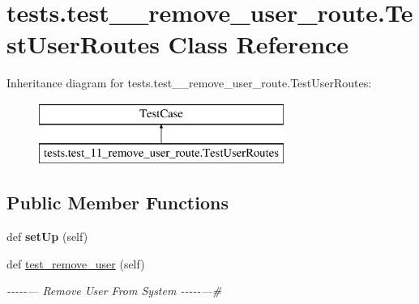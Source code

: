\hypertarget{classtests_1_1test__11__remove__user__route_1_1_test_user_routes}{}\section{tests.\+test\+\_\+\_\+remove\+\_\+user\+\_\+route.\+Test\+User\+Routes Class Reference}
\label{classtests_1_1test__11__remove__user__route_1_1_test_user_routes}
Inheritance diagram for tests.\+test\+\_\+\_\+remove\+\_\+user\+\_\+route.\+Test\+User\+Routes\+:\begin{figure}[H]
\begin{center}
\leavevmode
\includegraphics[height=2.000000cm]{classtests_1_1test__11__remove__user__route_1_1_test_user_routes}
\end{center}
\end{figure}
\subsection*{Public Member Functions}
\begin{DoxyCompactItemize}
\item 
\mbox{\label{classtests_1_1test__11__remove__user__route_1_1_test_user_routes_a7f6fc390ad0ed6aaada5583ad450e24f}} 
def {\bfseries set\+Up} (self)
\item 
\mbox{\label{classtests_1_1test__11__remove__user__route_1_1_test_user_routes_a4fab17fe9092281d33bbd317fbfed212}} 
def \hyperlink{classtests_1_1test__11__remove__user__route_1_1_test_user_routes_a4fab17fe9092281d33bbd317fbfed212}{test\+\_\+remove\+\_\+user} (self)
\begin{DoxyCompactList}\small\item\em -\/-\/-\/-\/-\/--- Remove User From System -\/-\/-\/-\/-\/---\# \end{DoxyCompactList}\end{DoxyCompactItemize}
